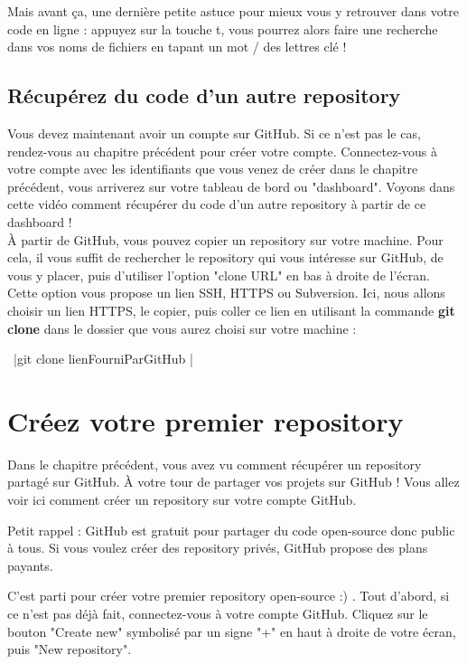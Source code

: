 \begin{remark} Mais avant ça, une dernière petite astuce pour mieux vous y retrouver dans votre code en ligne : appuyez sur la touche t, vous pourrez alors faire une recherche dans vos noms de fichiers en tapant un mot / des lettres clé ! \end{remark}

\subsection{Récupérez du code d'un autre repository}
Vous devez maintenant avoir un compte sur GitHub. Si ce n'est pas le cas, rendez-vous au chapitre précédent pour créer votre compte. Connectez-vous à votre compte avec les identifiants que vous venez de créer dans le chapitre précédent, vous arriverez sur votre tableau de bord ou "dashboard". Voyons dans cette vidéo comment récupérer du code d'un autre repository à partir de ce dashboard !\\

À partir de GitHub, vous pouvez copier un repository sur votre machine. Pour cela, il vous suffit de rechercher le repository qui vous intéresse sur GitHub, de vous y placer, puis d'utiliser l'option "clone URL" en bas à droite de l'écran. \\

Cette option vous propose un lien SSH, HTTPS ou Subversion. Ici, nous allons choisir un lien HTTPS, le copier, puis coller ce lien en utilisant la commande \textbf{git clone} dans le dossier que vous aurez choisi sur votre machine : 

\ |git clone lienFourniParGitHub |

\section{Créez votre premier repository}
Dans le chapitre précédent, vous avez vu comment récupérer un repository partagé sur GitHub. À votre tour de partager vos projets sur GitHub ! Vous allez voir ici comment créer un repository sur votre compte GitHub. 

\begin{remark} Petit rappel : GitHub est gratuit pour partager du code open-source donc public à tous. Si vous voulez créer des repository privés, GitHub propose des plans payants.\end{remark} 

C'est parti pour créer votre premier repository open-source :) . Tout d'abord, si ce n'est pas déjà fait, connectez-vous à votre compte GitHub. Cliquez sur le bouton "Create new" symbolisé par un signe "+" en haut à droite de votre écran, puis "New repository". 

